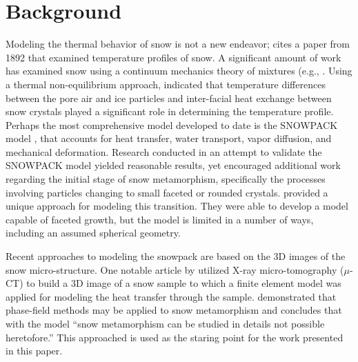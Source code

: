 \section{Background}\label{sec:background}
Modeling the thermal behavior of snow is not a new endeavor; \citet{lachapelle1960critique} cites a paper from 1892 that examined temperature profiles of snow. A significant amount of work has examined snow using a continuum mechanics theory of mixtures (e.g., \citet{adams1989constitutive, brown1999mixture}.  Using a thermal non-equilibrium approach, \citet{bartelt2004nonequilibrium} indicated that temperature differences between the pore air and ice particles and inter-facial heat exchange between snow crystals played a significant role in determining the temperature profile. Perhaps the most comprehensive model developed to date is the SNOWPACK model \citep{bartelt2002physical, lehning2002physiCal, lehning2002physicalb}, that accounts for heat transfer, water transport, vapor diffusion, and mechanical deformation.  Research conducted in an attempt to validate the SNOWPACK model yielded reasonable results, yet \citet{fierz2001assessment} encouraged additional work regarding the initial stage of snow metamorphism, specifically the processes involving particles changing to small faceted or rounded crystals. \citet{miller2009microstructural} provided a unique approach for modeling this transition. They were able to develop a model capable of faceted growth, but the model is limited in a number of ways, including an assumed spherical geometry.

Recent approaches to modeling the snowpack are based on the 3D images of the snow micro-structure.  One notable article by \citet{kaempfer2005microstructural} utilized X-ray micro-tomography ($\mu$-CT) to build a 3D image of a snow sample to which a finite element model was applied for modeling the heat transfer through the sample. \citet{kaempfer2009phase} demonstrated that phase-field methods may be applied to snow metamorphism and concludes that with the model ``snow metamorphism can be studied in details not possible heretofore.'' This approached is used as the staring point for the work presented in this paper.


